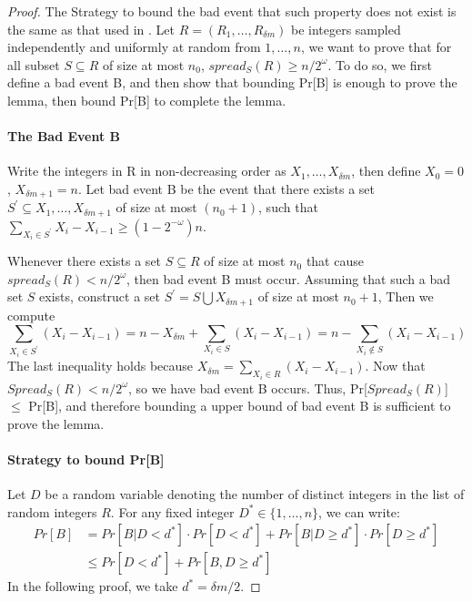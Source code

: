 \begin{proof}
  The Strategy to bound the bad event that such property does not exist is the same as that used in \cite{corrigan2016balloon}.
  Let $R = (R_1, \dots, R_{\delta m})$ be integers sampled independently and uniformly at random from ${1,\dots,n}$, we want to
  prove that for all subset $S \subseteq R$ of size at most $n_0$, $spread_S(R) \geq n/2^\omega$. To do so, we first define a bad
  event B, and then show that bounding Pr[B] is enough to prove the lemma, then bound Pr[B] to complete the lemma.

  \paragraph{The Bad Event B}
  Write the integers in R in non-decreasing order as $X_1,\dots, X_{\delta m}$, then define $X_0 = 0$, $X_{\delta m+1} = n$.
  Let bad event B be the event that there exists a set $S^\prime \subseteq {X_1, \dots, X_{\delta m+1}}$ of size at most $(n_0+1)$,
  such that $\sum_{X_i\in S^\prime}{X_i - X_{i-1}} \geq (1-2^{-\omega})n$.

  Whenever there exists a set $S \subseteq R$ of size at most $n_0$ that cause $spread_S(R) < n/2^{\omega}$, then bad event B must occur.
  Assuming that such a bad set $S$ exists, construct a set $S^\prime = S \bigcup {X_{\delta m + 1}}$ of size at most $n_0 + 1$, Then we
  compute
  \begin{equation}
    \sum_{X_i \in S^\prime}{(X_i - X_{i-1})} = n - X_{\delta m} + \sum_{X_i \in S}{(X_i - X_{i-1})}
    = n - \sum_{X_i \not\in S}{(X_i - X_{i-1})}
  \end{equation}
  The last inequality holds because $X_{\delta m} = \sum_{X_i \in R}{(X_i - X_{i-1})}$. Now that $Spread_S(R) < n/2^\omega$, so we have
  bad event B occurs. Thus, Pr[$Spread_S(R)$] $\leq$ Pr[B], and therefore bounding a upper bound of bad event B is sufficient to prove the
  lemma.

  \paragraph{Strategy to bound Pr[B]}
  Let $D$ be a random variable denoting the number of distinct integers in the list of random integers $R$. For any fixed integer $D^* \in \{1,\dots,n\}$,
  we can write:
  \begin{align}
  Pr[B] &= Pr[B|D < d^*] \cdot Pr[D < d^*] + Pr[B|D \geq d^*] \cdot Pr[D \geq d^*] \\
  &\leq Pr[D < d^*] + Pr[B,D \geq d^*]
  \end{align}
  In the following proof, we take $d^* = \delta m/2$.


\end{proof}
